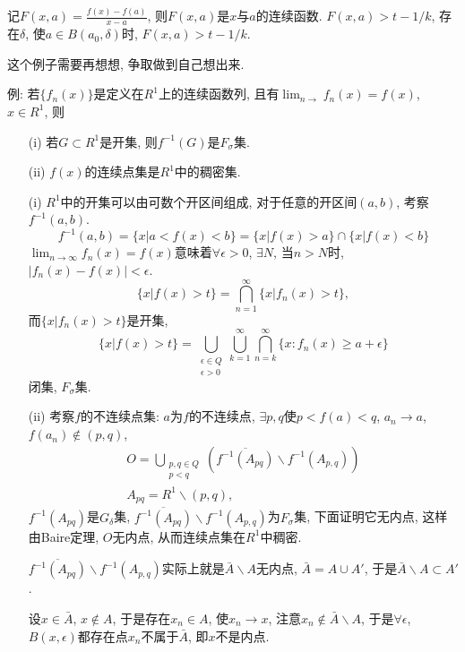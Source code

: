 \documentclass[12pt,a4paper,openany]{book}
\begin{document}
记$F(x, a) = \frac{f(x) - f(a)}{x-a}$, 则$F(x, a)$是$x$与$a$的连续函数. $F(x, a) > t - 1/k$, 存在$\delta$, 使$a \in B(a_0, \delta)$时, $F(x,a) > t - 1/k$.

这个例子需要再想想, 争取做到自己想出来.

例: 若$\{f_n(x)\}$是定义在$R^1$上的连续函数列, 且有$\lim_{n \rightarrow}{f_n(x)} = f(x)$, $x \in R^1$, 则
\begin{enumerate}
\item[(i)] 若$G \subset R^1$是开集, 则$f^{-1}(G)$是$F_{\sigma}$集.
\item[(ii)] $f(x)$的连续点集是$R^1$中的稠密集.
\end{enumerate}

\begin{enumerate}
\item[(i)] $R^1$中的开集可以由可数个开区间组成, 对于任意的开区间$(a, b)$, 考察$f^{-1}(a, b)$.
\[
f^{-1}(a,b) = \{x | a < f(x) < b\} = \{x | f(x) > a\} \cap \{x | f(x) < b\}
\]
$\lim_{n \rightarrow \infty}{f_n(x)} = f(x)$意味着$\forall \epsilon > 0$, $\exists N$, 当$n > N$时, $|f_n(x) - f(x)| < \epsilon$.
\[
\{x | f(x) > t\} = \bigcap_{n=1}^{\infty}{\{ x | f_n(x) > t\}},
\]
而$\{ x | f_n(x) > t\}$是开集,
\[
\{x | f(x) > t\} = \bigcup_{\substack{\epsilon \in Q \\ \epsilon > 0}}{\bigcup_{k=1}^{\infty}{\bigcap_{n=k}^{\infty}{\{x : f_n(x) \ge a + \epsilon\}}}}
\]
闭集, $F_{\sigma}$集.

\item[(ii)] 考察$f$的不连续点集: $a$为$f$的不连续点, $\exists p,q$使$p < f(a) < q$, $a_n \rightarrow a$, $f(a_n) \notin (p, q)$,
\begin{gather*}
O = \bigcup_{\substack{p,q \in Q\\ p < q}}{(\overline{f^{-1}(A_{pq})} \backslash f^{-1}(A_{p,q}))} \\
A_{pq} = R^1 \backslash(p, q),
\end{gather*}
$f^{-1}(A_{pq})$是$G_{\delta}$集, $\overline{f^{-1}(A_{pq})} \backslash f^{-1}(A_{p,q})$为$F_{\sigma}$集, 下面证明它无内点, 这样由Baire定理, $O$无内点, 从而连续点集在$R^1$中稠密.

$\overline{f^{-1}(A_{pq})} \backslash f^{-1}(A_{p,q})$实际上就是$\bar{A} \backslash A$无内点, $\bar{A} = A \cup A'$, 于是$\bar{A} \backslash A \subset A'$.

设$x \in \bar{A}$, $x \notin A$, 于是存在$x_n \in A$, 使$x_n \rightarrow x$, 注意$x_n \notin \bar{A} \backslash A$, 于是$\forall \epsilon$, $B(x, \epsilon)$都存在点$x_n$不属于$\bar{A}$, 即$x$不是内点.
\end{enumerate}
\end{document}
